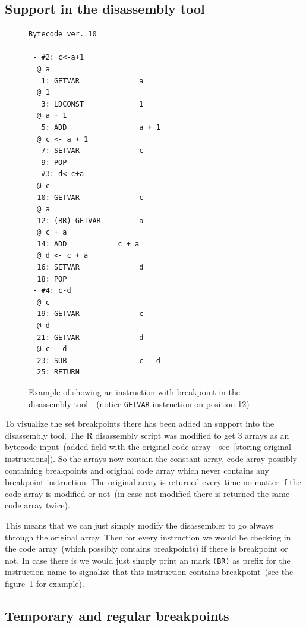 \documentclass[thesis=M,english]{FITthesis}[2018/10/20]
\newcommand{\code}[1]{\texttt{#1}}
\begin{document}
\subsection{Support in the disassembly tool}\label{debugger-support-in-disassembly}

\begin{figure}[h]
\begin{lstlisting}
Bytecode ver. 10

 - #2: c<-a+1
  @ a
   1: GETVAR              a
  @ 1
   3: LDCONST             1
  @ a + 1
   5: ADD                 a + 1
  @ c <- a + 1
   7: SETVAR              c
   9: POP
 - #3: d<-c+a
  @ c
  10: GETVAR              c
  @ a
  12: (BR) GETVAR         a
  @ c + a
  14: ADD            c + a
  @ d <- c + a
  16: SETVAR              d
  18: POP
 - #4: c-d
  @ c
  19: GETVAR              c
  @ d
  21: GETVAR              d
  @ c - d
  23: SUB                 c - d
  25: RETURN
\end{lstlisting}
	\caption{Example of showing an instruction with breakpoint in the disassembly tool - (notice \code{GETVAR} instruction on position 12)}\label{fig:breakpoints-in-disassembly-example}
\end{figure}


To visualize the set breakpoints there has been added an support into the disassembly tool. The R disassembly script was modified to get 3 arrays as an bytecode input~(added field with the original code array - see~\ref{storing-original-instructions}). So the arrays now contain the constant array, code array possibly containing breakpoints and original code array which never contains any breakpoint instruction. The original array is returned every time no matter if the code array is modified or not~(in case not modified there is returned the same code array twice).

This means that we can just simply modify the disassembler to go always through the original array. Then for every instruction we would be checking in the code array~(which possibly contains breakpoints) if there is breakpoint or not. In case there is we would just simply print an mark \code{(BR)} as prefix for the instruction name to signalize that this instruction contains breakpoint~(see the figure~\ref{fig:breakpoints-in-disassembly-example} for example).

\subsection{Temporary and regular breakpoints}\label{temporary-and-regular-breakpoints}
\end{document}
